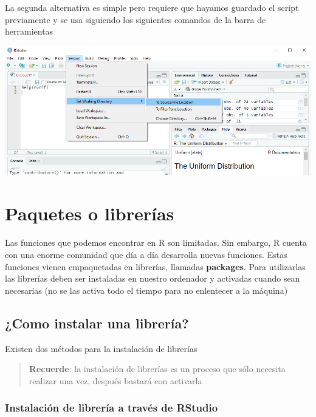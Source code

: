 \documentclass[
]{book}
\begin{document}
La segunda alternativa es simple pero requiere que hayamos guardado el script previamente y se usa siguiendo los siguientes comandos de la barra de herramientas

\includegraphics[width=13.78in]{img/Rstudiofig7}

\hypertarget{paquetes-o-libreruxedas}{%
\section{Paquetes o librerías}\label{paquetes-o-libreruxedas}}

Las funciones que podemos encontrar en R son limitadas. Sin embargo, R cuenta con una enorme comunidad que día a día desarrolla nuevas funciones. Estas funciones vienen empaquetadas en librerías, llamadas \textbf{packages}.
Para utilizarlas las librerías deben ser instaladas en nuestro ordenador y activadas cuando sean necesarias (no se las activa todo el tiempo para no enlentecer a la máquina)

\hypertarget{como-instalar-una-libreruxeda}{%
\subsection{¿Como instalar una librería?}\label{como-instalar-una-libreruxeda}}

Existen dos métodos para la instalación de librerías

\begin{quote}
\textbf{Recuerde}: la instalación de librerías es un proceso que sólo necesita realizar una vez, después bastará con activarla
\end{quote}

\hypertarget{instalaciuxf3n-de-libreruxeda-a-travuxe9s-de-rstudio}{%
\subsubsection{Instalación de librería a través de RStudio}\label{instalaciuxf3n-de-libreruxeda-a-travuxe9s-de-rstudio}}
\end{document}
